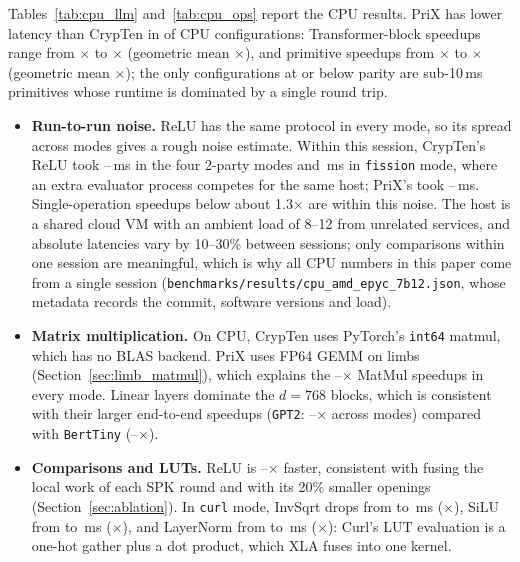 \documentclass[11pt]{article}
\begin{document}
Tables~\ref{tab:cpu_llm} and~\ref{tab:cpu_ops} report the CPU results. PriX has lower latency than CrypTen in \cpuNumFaster{} of \cpuNumConfigs{} CPU configurations: Transformer-block speedups range from \textbf{\cpuLlmSpeedupMin$\times$} to \textbf{\cpuLlmSpeedupMax$\times$} (geometric mean \cpuLlmSpeedupGeomean$\times$), and primitive speedups from \cpuOpsSpeedupMin$\times$ to \cpuOpsSpeedupMax$\times$ (geometric mean \cpuOpsSpeedupGeomean$\times$); the only configurations at or below parity are sub-10\,ms primitives whose runtime is dominated by a single round trip.
\begin{itemize}
    \item \textbf{Run-to-run noise.} ReLU has the same protocol in every mode, so its spread across modes gives a rough noise estimate. Within this session, CrypTen's ReLU took \cpuCryptenReLUMin--\cpuCryptenReLUMax\,ms in the four 2-party modes and \cpuCryptenFissionReLU\,ms in \texttt{fission} mode, where an extra evaluator process competes for the same host; PriX's took \cpuPrixReLUMin--\cpuPrixReLUMax\,ms. Single-operation speedups below about 1.3$\times$ are within this noise. The host is a shared cloud VM with an ambient load of 8--12 from unrelated services, and absolute latencies vary by 10--30\% between sessions; only comparisons within one session are meaningful, which is why all CPU numbers in this paper come from a single session (\texttt{benchmarks/results/cpu\_amd\_epyc\_7b12.json}, whose metadata records the commit, software versions and load).
    \item \textbf{Matrix multiplication.} On CPU, CrypTen uses PyTorch's \texttt{int64} matmul, which has no BLAS backend. PriX uses FP64 GEMM on limbs (Section~\ref{sec:limb_matmul}), which explains the \cpuSpMatMulMin--\cpuSpMatMulMax$\times$ MatMul speedups in every mode. Linear layers dominate the $d = 768$ blocks, which is consistent with their larger end-to-end speedups (\texttt{GPT2}: \cpuSpCryptenGPT--\cpuSpFissionGPT$\times$ across modes) compared with \texttt{BertTiny} (\cpuSpCryptenBertTiny--\cpuSpFissionBertTiny$\times$).
    \item \textbf{Comparisons and LUTs.} ReLU is \cpuSpReLUMin--\cpuSpReLUMax$\times$ faster, consistent with fusing the local work of each SPK round and with its 20\% smaller openings (Section~\ref{sec:ablation}). In \texttt{curl} mode, InvSqrt drops from \cpuCryptenCurlInvSqrt{} to \cpuPrixCurlInvSqrt\,ms (\cpuSpCurlInvSqrt$\times$), SiLU from \cpuCryptenCurlSiLU{} to \cpuPrixCurlSiLU\,ms (\cpuSpCurlSiLU$\times$), and LayerNorm from \cpuCryptenCurlLayerNorm{} to \cpuPrixCurlLayerNorm\,ms (\cpuSpCurlLayerNorm$\times$): Curl's LUT evaluation is a one-hot gather plus a dot product, which XLA fuses into one kernel.

\end{itemize}
\end{document}
